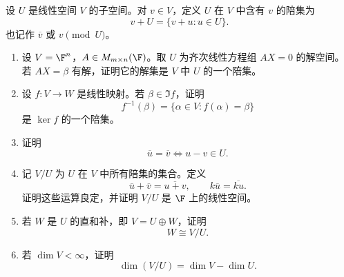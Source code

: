 \begin{problem}[陪集与商空间]
	设 $U$ 是线性空间 $V$ 的子空间。对 $v\in V$，定义 $U$ 在 $V$ 中含有 $v$ 的陪集为
	\[
	v+U=\{v+u:u\in U\}.
	\]
	也记作 $\overline v$ 或 $v\pmod U$。
	\begin{enumerate}
		\item 设 $V=\F^n$，$A\in M_{m\times n}(\F)$。取 $U$ 为齐次线性方程组 $AX=0$ 的解空间。若 $AX=\beta$ 有解，证明它的解集是 $V$ 中 $U$ 的一个陪集。
		\item 设 $f:V\to W$ 是线性映射。若 $\beta\in\Im f$，证明
		\[
		f^{-1}(\beta)=\{\alpha\in V:f(\alpha)=\beta\}
		\]
		是 $\ker f$ 的一个陪集。
		\item 证明
		\[
		\overline u=\overline v
		\Longleftrightarrow
		u-v\in U.
		\]
		\item 记 $V/U$ 为 $U$ 在 $V$ 中所有陪集的集合。定义
		\[
		\overline u+
		\overline v=\overline{u+v},
		\qquad
		k\overline u=\overline{ku}.
		\]
		证明这些运算良定，并证明 $V/U$ 是 $\F$ 上的线性空间。
		\item 若 $W$ 是 $U$ 的直和补，即 $V=U\oplus W$，证明
		\[
		W\cong V/U.
		\]
		\item 若 $\dim V<\infty$，证明
		\[
		\dim(V/U)=\dim V-\dim U.
		\]
	\end{enumerate}
\end{problem}

